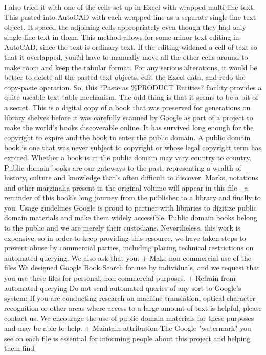 \documentclass[a4paper]{article}
\begin{document}
{I also tried it with one of the cells set up in Excel with wrapped multi-line text. This pasted into AutoCAD with each wrapped line as a separate single-line text object. It spaced the adjoining cells appropriately even though they had only single-line text in them.
This method allows for some minor text editing in AutoCAD, since the text is ordinary text. If the editing widened a cell of text so that it overlapped, you?d have to manually move all the other cells around to make room and keep the tabular format. For any serious alterations, it would be better to delete all the pasted text objects, edit the Excel data, and redo the copy-paste operation.
So, this ?Paste as \%PRODUCT Entities? facility provides a quite useable text table mechanism. The odd thing is that it seems to be a bit of a secret.
This is a digital copy of a book that was preserved for generations on library shelves before it was carefully scanned by Google as part of a project 
to make the world's books discoverable online. 
It has survived long enough for the copyright to expire and the book to enter the public domain. A public domain book is one that was never subject 
to copyright or whose legal copyright term has expired. Whether a book is in the public domain may vary country to country. Public domain books 
are our gateways to the past, representing a wealth of history, culture and knowledge that's often difficult to discover. 
Marks, notations and other marginalia present in the original volume will appear in this file - a reminder of this book's long journey from the 
publisher to a library and finally to you. 
Usage guidelines 
Google is proud to partner with libraries to digitize public domain materials and make them widely accessible. Public domain books belong to the 
public and we are merely their custodians. Nevertheless, this work is expensive, so in order to keep providing this resource, we have taken steps to 
prevent abuse by commercial parties, including placing technical restrictions on automated querying. 
We also ask that you: 
+ Make non-commercial use of the files We designed Google Book Search for use by individuals, and we request that you use these files for 
personal, non-commercial purposes. 
+ Refrain from automated querying Do not send automated queries of any sort to Google's system: If you are conducting research on machine 
translation, optical character recognition or other areas where access to a large amount of text is helpful, please contact us. We encourage the 
use of public domain materials for these purposes and may be able to help. 
+ Maintain attribution The Google "watermark" you see on each file is essential for informing people about this project and helping them find 
}
\end{document}

